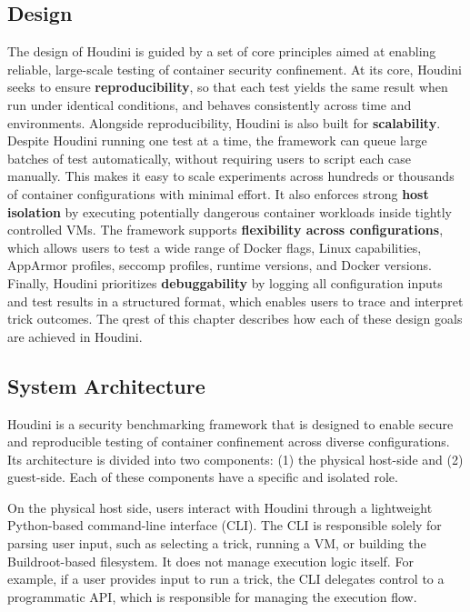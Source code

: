 \documentclass[12pt]{report}
\begin{document}
\begin{doublespace}
\chapter{Design}

The design of Houdini is guided by a set of core principles aimed at enabling reliable, large-scale testing of container security confinement. At its core, Houdini seeks to ensure \textbf{reproducibility}, so that each test yields the same result when run under identical conditions, and behaves consistently across time and environments. Alongside reproducibility, Houdini is also built for \textbf{scalability}. Despite Houdini running one test at a time, the framework can queue large batches of test automatically, without requiring users to script each case manually. This makes it easy to scale experiments across hundreds or thousands of container configurations with minimal effort. It also enforces strong \textbf{host isolation} by executing potentially dangerous container workloads inside tightly controlled VMs. The framework supports \textbf{flexibility across configurations}, which allows users to test a wide range of Docker flags, Linux capabilities, AppArmor profiles, seccomp profiles, runtime versions, and Docker versions. Finally, Houdini prioritizes \textbf{debuggability} by logging all configuration inputs and test results in a structured format, which enables users to trace and interpret trick outcomes. The qrest of this chapter describes how each of these design goals are achieved in Houdini.



\section{System Architecture}
Houdini is a security benchmarking framework that is designed to enable secure and reproducible testing of container confinement across diverse configurations. Its architecture is divided into two components: (1) the physical host-side and (2) guest-side. Each of these components have a specific and isolated role.

On the physical host side, users interact with Houdini through a lightweight Python-based command-line interface (CLI). The CLI is responsible solely for parsing user input, such as selecting a trick, running a VM, or building the Buildroot-based filesystem. It does not manage execution logic itself. For example, if a user provides input to run a trick, the CLI delegates control to a programmatic API, which is responsible for managing the execution flow.


\end{doublespace}
\end{document}
